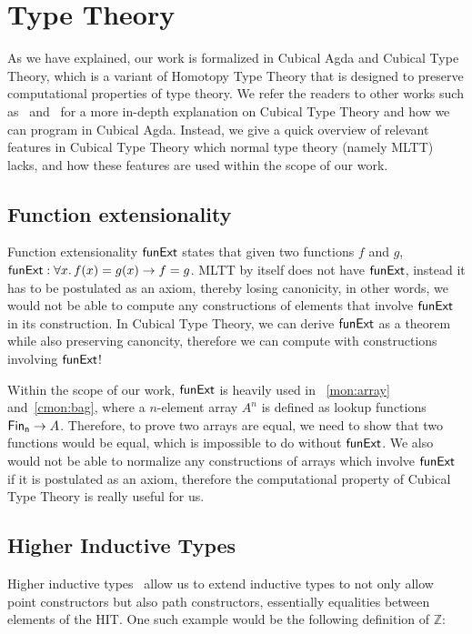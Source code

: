 \section{Type Theory}
\label{sec:type-theory}
As we have explained, our work is formalized in Cubical Agda and Cubical Type Theory,
which is a variant of Homotopy Type Theory that is designed to preserve
computational properties of type theory.
We refer the readers to other works such as~\cite{vezzosiCubicalAgdaDependently2019}
and~\cite{cohenCubicalTypeTheory2018} for a more in-depth explanation on Cubical Type Theory
and how we can program in Cubical Agda. Instead, we give a quick overview of relevant features
in Cubical Type Theory which normal type theory (namely MLTT) lacks, and how these features
are used within the scope of our work.

\subsection{Function extensionality}
Function extensionality $\operatorname{\mathsf{funExt}}$ states that given two functions $f$ and $g$,
$\operatorname{\mathsf{funExt}}: \forall x.\,f(x) = g(x) \to f = g$. MLTT by itself does not have $\operatorname{\mathsf{funExt}}$,
instead it has to be postulated as an axiom, thereby losing canonicity, in other words,
we would not be able to compute any constructions of elements that involve $\operatorname{\mathsf{funExt}}$
in its construction. In Cubical Type Theory, we can derive $\operatorname{\mathsf{funExt}}$
as a theorem while also preserving canoncity, therefore we can compute with constructions
involving $\operatorname{\mathsf{funExt}}$!

Within the scope of our work, $\operatorname{\mathsf{funExt}}$ is heavily used in
~\cref{mon:array} and~\cref{cmon:bag}, where a $n$-element array $A^n$ is defined as lookup functions
$\Fin[n] \to A$. Therefore, to prove two arrays are equal, we need to show that two functions would be
equal, which is impossible to do without $\operatorname{\mathsf{funExt}}$. We also would not be able to normalize
any constructions of arrays which involve $\operatorname{\mathsf{funExt}}$ if it is postulated as an axiom, therefore
the computational property of Cubical Type Theory is really useful for us.

\subsection{Higher Inductive Types}
Higher inductive types~\cite{cavalloHigherInductiveTypes2019}
allow us to extend inductive types to not only allow point constructors
but also path constructors, essentially equalities between elements of the HIT. One such example
would be the following definition of $\mathbb{Z}$:


